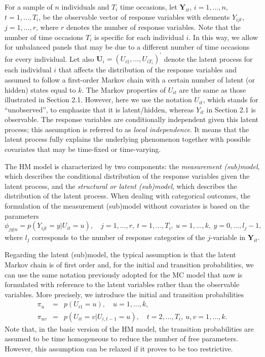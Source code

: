 For a sample of \(n\) individuals and \(T_i\) time occasions, let
\(\boldsymbol{Y}_{it}\), \(i=1,\ldots,n\), \(t=1,\ldots,T_i\), be the observable vector
of response variables with elements \(Y_{ijt}\), \(j=1,\ldots,r\), where \(r\)
denotes the number of response variables. Note that the number of time
occasions \(T_i\) is specific for each individual \(i\). In this way, we
allow for unbalanced panels that may be due to a different number of
time occasions for every individual. Let also
\(\boldsymbol{U}_i = (U_{i1},\ldots,U_{iT_i})^\prime\) denote the latent process
for each individual \(i\) that affects the distribution of the response
variables and assumed to follow a first-order Markov chain with a
certain number of latent (or hidden) states equal to \(k\). The Markov
properties of \(U_{it}\) are the same as those illustrated in Section 2.1. However, here we use the notation \(U_{it}\), which stands for ``unobserved'', to emphasize that it is latent/hidden, whereas
\(Y_{it}\) in Section 2.1 is observable. The
response variables are conditionally independent given this latent
process; this assumption is referred to as \emph{local independence}. It
means that the latent process fully explains the underlying phenomenon
together with possible covariates that may be time-fixed or
time-varying.

The HM model is characterized by two components: the \emph{measurement
(sub)model}, which describes the conditional distribution of the
response variables given the latent process, and the \emph{structural or
latent (sub)model}, which describes the distribution of the latent
process. When dealing with categorical outcomes, the formulation of the
measurement (sub)model without covariates is based on the parameters
\begin{equation}
\phi_{jy|u} = p(Y_{ijt} = y | U_{it} = u),\quad
j = 1,\ldots,r,  \: t = 1,\ldots,T_i, \: u = 1, \ldots, k,\: y = 0,\ldots, l_j - 1,
\label{eq:hmcond}
\end{equation} where \(l_j\) corresponds to the number of response
categories of the \(j\)-variable in \(\boldsymbol{Y}_{it}\).

Regarding the latent (sub)model, the typical assumption is that the
latent Markov chain is of first order and, for the initial and
transition probabilities, we can use the same notation previously
adopted for the MC model that now is formulated with reference to the latent variables
rather than the observable variables. More precisely, we introduce the
initial and transition probabilities \begin{eqnarray*}
\pi_{u}&=&p(U_{i1}=u),\quad u=1,\ldots,k,\\
\pi_{uv}&=&p(U_{it}=v|U_{i,t-1}=u),\quad t=2,\ldots,T_i,\: u,v=1,\ldots,k.
\end{eqnarray*} Note that, in the basic version of the HM model, the
transition probabilities are assumed to be time homogeneous to reduce
the number of free parameters. However, this assumption can be relaxed if it proves to be too restrictive.

